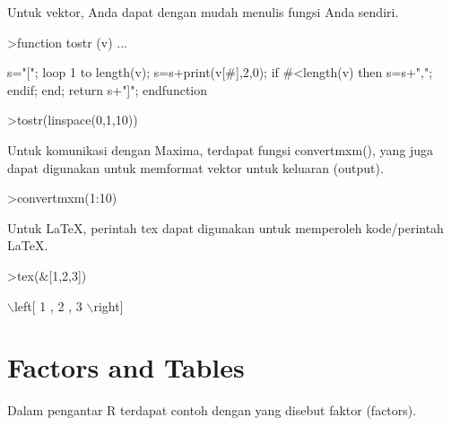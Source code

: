 \documentclass{article}
\newenvironment{eulernotebook}{\par}{\par}
\newcommand{\eulerheading}[1]{\section{#1}}
\newenvironment{eulercomment}{\par\medskip}{\par\medskip}
\begin{document}
\begin{eulernotebook}
\begin{eulercomment}
\begin{eulercomment}
\begin{eulercomment}
\begin{eulercomment}
\begin{eulercomment}
Untuk vektor, Anda dapat dengan mudah menulis fungsi Anda sendiri.
\end{eulercomment}
\begin{eulerprompt}
>function tostr (v) ...
\end{eulerprompt}
\begin{eulerudf}
  s="[";
  loop 1 to length(v);
     s=s+print(v[#],2,0);
     if #<length(v) then s=s+","; endif;
  end;
  return s+"]";
  endfunction
\end{eulerudf}
\begin{eulerprompt}
>tostr(linspace(0,1,10))
\end{eulerprompt}
\begin{euleroutput}
  [0.00,0.10,0.20,0.30,0.40,0.50,0.60,0.70,0.80,0.90,1.00]
\end{euleroutput}
\begin{eulercomment}
Untuk komunikasi dengan Maxima, terdapat fungsi convertmxm(), yang
juga dapat digunakan untuk memformat vektor untuk keluaran (output).
\end{eulercomment}
\begin{eulerprompt}
>convertmxm(1:10)
\end{eulerprompt}
\begin{euleroutput}
  [1,2,3,4,5,6,7,8,9,10]
\end{euleroutput}
\begin{eulercomment}
Untuk LaTeX, perintah tex dapat digunakan untuk memperoleh
kode/perintah LaTeX.
\end{eulercomment}
\begin{eulerprompt}
>tex(&[1,2,3])
\end{eulerprompt}
\begin{euleroutput}
  \(\backslash\)left[ 1 , 2 , 3 \(\backslash\)right] 
\end{euleroutput}
\eulerheading{Factors and Tables}
\begin{eulercomment}
Dalam pengantar R terdapat contoh dengan yang disebut faktor
(factors).


\end{eulercomment}
\end{eulercomment}
\end{eulercomment}
\end{eulercomment}
\end{eulercomment}
\end{eulernotebook}
\end{document}
